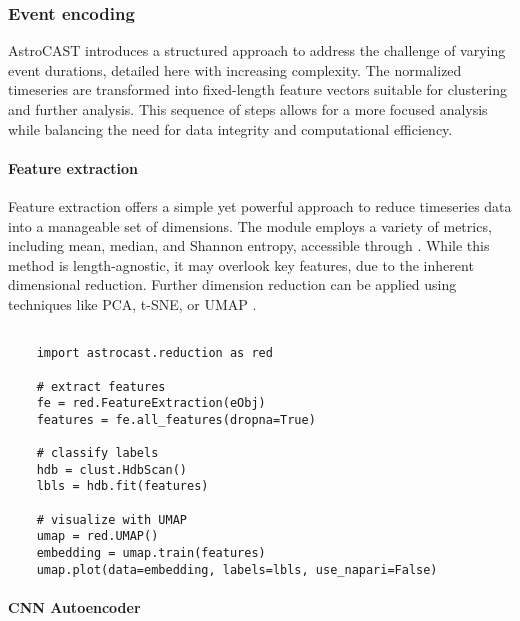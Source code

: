 \subsubsection{Event encoding}

AstroCAST introduces a structured approach to address the challenge of varying event durations, detailed here with increasing complexity. The normalized timeseries are transformed into fixed-length feature vectors suitable for clustering and further analysis. This sequence of steps allows for a more focused analysis while balancing the need for data integrity and computational efficiency.


\paragraph{Feature extraction}
Feature extraction offers a simple yet powerful approach to reduce timeseries data into a manageable set of dimensions. The module employs a variety of metrics, including mean, median, and Shannon entropy, accessible through . While this method is length-agnostic, it may overlook key features, due to the inherent dimensional reduction. Further dimension reduction can be applied using techniques like PCA, t-SNE, or UMAP .

\begin{lstlisting}[style=pyStyle]

    import astrocast.reduction as red

    # extract features
    fe = red.FeatureExtraction(eObj)
    features = fe.all_features(dropna=True)

    # classify labels
    hdb = clust.HdbScan()
    lbls = hdb.fit(features)

    # visualize with UMAP
    umap = red.UMAP()
    embedding = umap.train(features)
    umap.plot(data=embedding, labels=lbls, use_napari=False)

\end{lstlisting}

\paragraph{\ac{CNN} Autoencoder}

